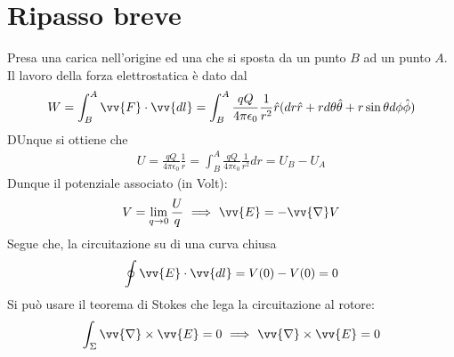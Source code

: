 \documentclass[a4paper, oneside]{article}
\begin{document}
\section{Ripasso breve}
\begin{figure}
    \centering
\end{figure}
Presa una carica nell'origine ed una che si sposta 
da un punto $B$ ad un punto $A$. Il lavoro della forza
elettrostatica è dato dal
\begin{gather*}
    W = \int_{B}^{A} \vv{F} \cdot \vv{dl}  = \int_{B}^{A} \frac{qQ}{4\pi\epsilon_0} \frac{1}{r^{2}} \hat{r}(dr \hat{r} + rd\theta \hat{\theta} + r\sin\theta d\phi \hat{\phi}   )     
\end{gather*} 
DUnque si ottiene che
\begin{gather*}
    U = \frac{qQ}{4\pi\epsilon_0} \frac{1}{r} = \int_{B}^{A} \frac{qQ}{4\pi\epsilon_0} \frac{1}{r^{2}} dr = U_B - U_A 
\end{gather*}
Dunque il potenziale associato (in Volt):
\begin{gather*}
    V = \lim_{q \to 0} \frac{U}{q} \ \Longrightarrow \ \vv{E} = -\vv{\nabla} V  
\end{gather*}
Segue che, la circuitazione su di una curva chiusa
\begin{gather*}
    \oint \vv{E} \cdot \vv{dl} = V(0) - V(0) = 0  
\end{gather*}
Si può usare il teorema di Stokes che lega la circuitazione al rotore:
\begin{gather*}
    \int_{\Sigma} \vv{\nabla} \times \vv{E} = 0   \ \Longrightarrow \ \vv{\nabla} \times \vv{E} = 0  
\end{gather*}
\end{document}
